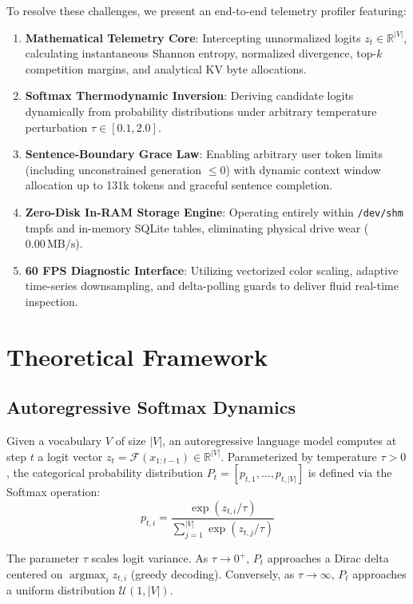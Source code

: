 \documentclass[10pt,twocolumn]{article}
\begin{document}
To resolve these challenges, we present an end-to-end telemetry profiler featuring:
\begin{enumerate}
    \item \textbf{Mathematical Telemetry Core}: Intercepting unnormalized logits $z_t \in \mathbb{R}^{|V|}$, calculating instantaneous Shannon entropy, normalized divergence, top-$k$ competition margins, and analytical KV byte allocations.
    \item \textbf{Softmax Thermodynamic Inversion}: Deriving candidate logits dynamically from probability distributions under arbitrary temperature perturbation $\tau \in [0.1, 2.0]$.
    \item \textbf{Sentence-Boundary Grace Law}: Enabling arbitrary user token limits (including unconstrained generation $\le 0$) with dynamic context window allocation up to 131k tokens and graceful sentence completion.
    \item \textbf{Zero-Disk In-RAM Storage Engine}: Operating entirely within \texttt{/dev/shm} tmpfs and in-memory SQLite tables, eliminating physical drive wear ($0.00\,\text{MB/s}$).
    \item \textbf{60 FPS Diagnostic Interface}: Utilizing vectorized color scaling, adaptive time-series downsampling, and delta-polling guards to deliver fluid real-time inspection.
\end{enumerate}

\section{Theoretical Framework}

\subsection{Autoregressive Softmax Dynamics}
Given a vocabulary $V$ of size $|V|$, an autoregressive language model computes at step $t$ a logit vector $z_t = \mathcal{F}(x_{1:t-1}) \in \mathbb{R}^{|V|}$. Parameterized by temperature $\tau > 0$, the categorical probability distribution $P_t = [p_{t,1}, \dots, p_{t,|V|}]$ is defined via the Softmax operation:
\begin{equation}
p_{t,i} = \frac{\exp(z_{t,i} / \tau)}{\sum_{j=1}^{|V|} \exp(z_{t,j} / \tau)}
\end{equation}

The parameter $\tau$ scales logit variance. As $\tau \to 0^+$, $P_t$ approaches a Dirac delta centered on $\operatorname{argmax}_i z_{t,i}$ (greedy decoding). Conversely, as $\tau \to \infty$, $P_t$ approaches a uniform distribution $\mathcal{U}(1, |V|)$.
\end{document}
